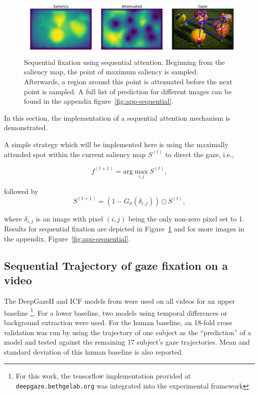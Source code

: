 \documentclass[a4paper,twocolumn,10pt]{article}
\begin{document}
\begin{figure}[tp]
  \centering
  \includegraphics[width=\textwidth]{fig/sequence-3.pdf}
  \caption{\small
  Sequential fixation using sequential attention.
  Beginning from the saliency map, the point of maximum saliency is sampled.
  Afterwards, a region around this point is attenuated before the next point
  is sampled.
  A full list of prediction for different images can be found in the appendix figure~\ref{fig:app-sequential}.
  }
  \label{fig:sequential}
\end{figure}

In this section, the implementation of a sequential attention mechanism is demonstrated.

A simple strategy which will be implemented here is using the maximally attended spot within the current saliency map $S^{(t)}$ to direct the gaze, i.e.,

\begin{equation}
f^{(t+1)} = \text{arg} \max_{i,j} S^{(t)},
\end{equation}

followed by
\begin{equation}
S^{(t+1)} = (1 - G_\sigma(\delta_{i,j})) \odot S^{(t)},
\end{equation}

where $\delta_{i,j}$ is an image with pixel $(i,j)$ being the only non-zero pixel set to 1.
Results for sequential fixation are depicted in Figure~\ref{fig:sequential} and for more images in the appendix, Figure~\ref{fig:app-sequential}.

\subsection{Sequential Trajectory of gaze fixation on a video}

The DeepGazeII and ICF models from \cite{Kummerer2017b} were used on all videos for an upper baseline \footnote{For this work, the tensorflow implementation provided at \texttt{deepgaze.bethgelab.org} was integrated into the experimental framework}.
For a lower baseline, two models using temporal differences or background extraction were used.
For the human baseline, an 18-fold cross validation was run by using the trajectory of one subject as the ``prediction'' of a model and tested against the remaining 17 subject's gaze trajectories.
Mean and standard deviation of this human baseline is also reported.
\end{document}
